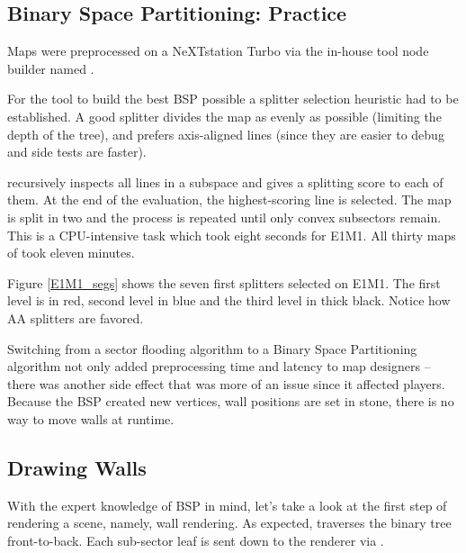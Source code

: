\subsection{Binary Space Partitioning: Practice}
Maps were preprocessed on a NeXTstation Turbo via the in-house tool node builder named .\\
\par
For the tool to build the best BSP possible a splitter selection heuristic had to be established. A good splitter divides the map as evenly as possible (limiting the depth of the tree), and prefers axis-aligned lines (since they are easier to debug and side tests are faster).\\
\par
  recursively inspects all lines in a subspace and gives a splitting score to each of them. At the end of the evaluation, the highest-scoring line is selected. The map is split in two and the process is repeated until only convex subsectors remain. This is a CPU-intensive task which took eight seconds for E1M1. All thirty maps of  took eleven minutes.\\
\par
{}
\par
Figure \ref{E1M1_segs} shows the seven first splitters selected on E1M1. The first level is in red, second level in blue and the third level in thick black. Notice how AA splitters are favored.\\
\par
Switching from a sector flooding algorithm to a Binary Space Partitioning algorithm not only added preprocessing time and latency to map designers -- there was another side effect that was more of an issue since it affected players. Because the BSP created new vertices, wall positions are set in stone, there is no way to move walls at runtime.

\vspace{5pt}

\par


\subsection{Drawing Walls}
With the expert knowledge of BSP in mind, let's take a look at the first step of rendering a scene, namely, wall rendering. As expected,  traverses the binary tree front-to-back. Each sub-sector leaf is sent down to the renderer via .\\
\par
{}
\par


